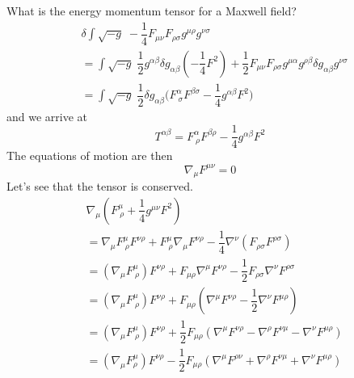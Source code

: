 \begin{ex}
What is the energy momentum tensor for a Maxwell field?
 \begin{align*}
 &\delta \int \sqrt{-g}\;-\dfrac{1}{4}F_{\mu \nu }F_{\rho \sigma }g^{\mu \rho }g^{\nu \sigma }\\
 &=\int\sqrt{-g}\;\dfrac{1}{2}g^{\alpha \beta }\delta g_{\alpha \beta }(-\dfrac{1}{4}F^2)+\dfrac{1}{2}F_{\mu \nu }F_{\rho \sigma }g^{\mu \alpha }g^{\rho \beta }\delta g_{\alpha \beta }g^{\nu \sigma }\\
 &=\int \sqrt{-g}\;\dfrac{1}{2}\delta g_{\alpha \beta }\Big(F^{\alpha }_{\ \sigma }F^{\beta \sigma }-\dfrac{1}{4}g^{\alpha \beta }F^2\Big)
 \end{align*}
and we arrive at
\[T^{\alpha \beta }=F^{\alpha }_{\ \rho }F^{\beta \rho }-\dfrac{1}{4}g^{\alpha \beta }F^2\]
The equations of motion are then
\[\nabla _{\mu }F^{\mu \nu }=0\]
Let's see that the tensor is conserved.
\begin{align*}
	&\nabla _{\mu }(F^{\mu }_{\ \rho }+\dfrac{1}{4}g^{\mu \nu }F^2)\\
&=\nabla _{\mu }F^{\mu }_{\ \rho }F^{\nu \rho }+F^{\mu }_{\ \rho }\nabla _{\mu }F^{\nu \rho }-\dfrac{1}{4}\nabla ^{\nu }(F_{\rho \sigma }F^{\rho \sigma })\\
&=(\nabla _{\mu }F^{\mu }_{\ \rho })F^{\nu \rho }+F_{\mu \rho }\nabla ^{\mu }F^{\nu \rho }-\dfrac{1}{2}F_{\rho \sigma }\nabla ^{\nu }F^{\rho \sigma }\\
&=(\nabla _{\mu }F^{\mu }_{\ \rho })F^{\nu \rho }+F_{\mu \rho }(\nabla ^{\mu }F^{\nu \rho }-\dfrac{1}{2}\nabla ^{\nu }F^{\mu \rho })\\
&=(\nabla _{\mu }F^{\mu }_{\ \rho })F^{\nu \rho }+\dfrac{1}{2}F_{\mu \rho }(\nabla ^{\mu }F^{\nu \rho }-\nabla ^{\rho }F^{\nu \mu }-\nabla ^{\nu }F^{\mu \rho })\\
&=(\nabla _{\mu }F^{\mu}_{\rho })F^{\nu \rho }-\dfrac{1}{2}F_{\mu \rho }(\nabla ^{\mu }F^{\rho \nu }+\nabla ^{\rho }F^{\nu \mu }+\nabla ^{\nu }F^{\mu \rho })
\end{align*}
\end{ex}
\vspace{2ex}

